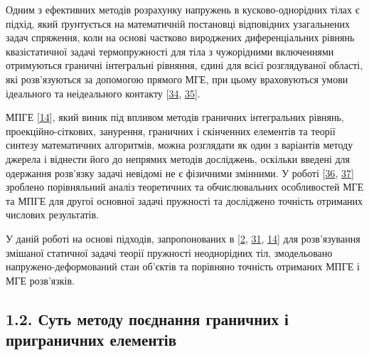 Одним з ефективних методів розрахунку напружень в кусково-однорідних
тілах є підхід, який ґрунтується на математичній постановці відповідних
узагальнених задач спряження, коли на основі частково вироджених
диференціальних рівнянь квазістатичної задачі термопружності для тіла з
чужорідними включеннями отримуються граничні інтегральні рівняння, єдині
для всієї розглядуваної області, які розв'язуються за допомогою прямого
МГЕ, при цьому враховуються умови ідеального та неідеального контакту
{[}\protect\hyperlink{anchor-22}{34},
\protect\hyperlink{anchor-23}{35}{]}.

МПГЕ {[}\protect\hyperlink{anchor-24}{14}{]}, який виник під впливом
методів граничних інтегральних рівнянь, проекційно-сіткових, занурення,
граничних і скінченних елементів та теорії синтезу математичних
алгоритмів, можна розглядати як один з варіантів методу джерела і
віднести його до непрямих методів досліджень, оскільки введені для
одержання розв'язку задачі невідомі не є фізичними змінними. У роботі
{[}\protect\hyperlink{anchor-25}{36},
\protect\hyperlink{anchor-26}{37}{]} зроблено порівняльний аналіз
теоретичних та обчислювальних особливостей МГЕ та МПГЕ для другої
основної задачі пружності та досліджено точність отриманих числових
результатів.

У даній роботі на основі підходів, запропонованих в
{[}\protect\hyperlink{anchor-2}{2}, \protect\hyperlink{anchor-19}{31},
\protect\hyperlink{anchor-24}{14}{]} для розв'язу­вання змішаної
статичної задачі теорії пружності неоднорідних тіл, змодельовано
напружено-деформований стан об'єктів та порів­няно точ­ність отриманих
МПГЕ і МГЕ розв'язків.

\hypertarget{ux441ux443ux442ux44c-ux43cux435ux442ux43eux434ux443-ux43fux43eux454ux434ux43dux430ux43dux43dux44f-ux433ux440ux430ux43dux438ux447ux43dux438ux445-ux456-ux43fux440ux438ux433ux440ux430ux43dux438ux447ux43dux438ux445-ux435ux43bux435ux43cux435ux43dux442ux456ux432}{%
\subsection[1.2. Суть методу поєднання граничних і приграничних
елементів]{\texorpdfstring{\protect\hypertarget{anchor-27}{}{}1.2. Суть
методу поєднання граничних і приграничних
елементів}{1.2. Суть методу поєднання граничних і приграничних елементів}}\label{ux441ux443ux442ux44c-ux43cux435ux442ux43eux434ux443-ux43fux43eux454ux434ux43dux430ux43dux43dux44f-ux433ux440ux430ux43dux438ux447ux43dux438ux445-ux456-ux43fux440ux438ux433ux440ux430ux43dux438ux447ux43dux438ux445-ux435ux43bux435ux43cux435ux43dux442ux456ux432}}

